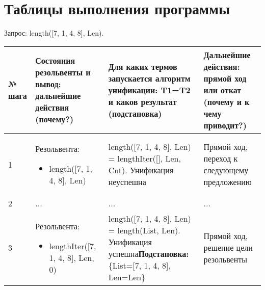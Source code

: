 \documentclass[14pt,a4paper]{scrreprt}
\begin{document}
\section{Таблицы выполнения программы}

Запрос: length([7, 1, 4, 8], Len).
\begin{table}[H]
	\begin{tabular}{|p{0.8cm\small}|p{4.7cm\small}|p{5.7cm\small}|p{4cm\small}|}	
		\hline
		№ шага & Состояния резольвенты и вывод: дальнейшие действия (почему?) & Для каких термов запускается алгоритм унификации: T1=T2 и каков результат (подстановка) & Дальнейшие действия: прямой ход или откат (почему и к чему приводит?)\\
		\hline
		1 & Резольвента: \begin{itemize}
			\item length([7, 1, 4, 8], Len)
		\end{itemize} & length([7, 1, 4, 8], Len) = lengthIter([], Len, Cnt). Унификация неуспешна & Прямой ход, переход к следующему предложению\\
		\hline
		2 & ... & ... & ...\\
		\hline
		3 & Резольвента: \begin{itemize} \item lengthIter([7, 1, 4, 8], Len, 0) \end{itemize} & length([7, 1, 4, 8], Len) = length(List, Len). Унификация успешна\linebreak \textbf{Подстановка:} \{List=[7, 1, 4, 8], Len=Len\} & Прямой ход, решение цели резольвенты \\
		\hline
	\end{tabular}
\end{table}
\end{document}
